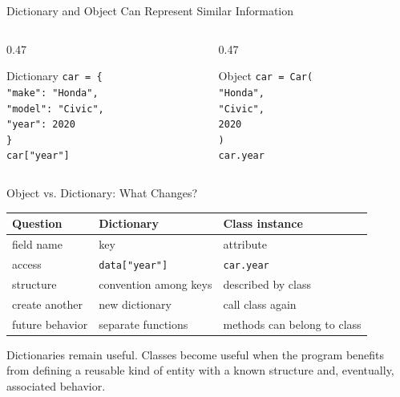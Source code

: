 \documentclass[aspectratio=169,10pt]{beamer}
\begin{document}
\begin{frame}{Dictionary and Object Can Represent Similar Information}
  \begin{columns}[T,onlytextwidth]
    \begin{column}{0.47\textwidth}
      \begin{block}{Dictionary}
        \texttt{car = \{}\\
        \hspace*{0.15in}\texttt{"make": "Honda",}\\
        \hspace*{0.15in}\texttt{"model": "Civic",}\\
        \hspace*{0.15in}\texttt{"year": 2020}\\
        \texttt{\}}\\[0.08in]
        \texttt{car["year"]}
      \end{block}
    \end{column}
    \begin{column}{0.47\textwidth}
      \begin{block}{Object}
        \texttt{car = Car(}\\
        \hspace*{0.15in}\texttt{"Honda",}\\
        \hspace*{0.15in}\texttt{"Civic",}\\
        \hspace*{0.15in}\texttt{2020}\\
        \texttt{)}\\[0.08in]
        \texttt{car.year}
      \end{block}
    \end{column}
  \end{columns}
\end{frame}

\begin{frame}{Object vs. Dictionary: What Changes?}
  \begin{center}
    \renewcommand{\arraystretch}{1.30}
    \begin{tabular}{l|l|l}
      \textbf{Question} & \textbf{Dictionary} & \textbf{Class instance} \\\hline
      field name & key & attribute \\
      access & \texttt{data["year"]} & \texttt{car.year} \\
      structure & convention among keys & described by class \\
      create another & new dictionary & call class again \\
      future behavior & separate functions & methods can belong to class
    \end{tabular}
  \end{center}

  \begin{keyidea}
    Dictionaries remain useful. Classes become useful when the program benefits from defining a reusable kind of entity with a known structure and, eventually, associated behavior.
  \end{keyidea}
\end{frame}
\end{document}
